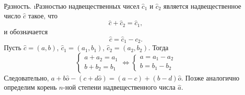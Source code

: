 \b{Разность.} \i{Разностью} надвещественных чисел $\hat{c}_1$ и $\hat{c}_2$ является надвещественное число $\hat{c}$ такое, что
	$$\hat{c}+\hat{c}_2=\hat{c}_1,$$
и обозначается
	$$\hat{c}=\hat{c}_1-\hat{c}_2.$$
Пусть $\hat{c}=(a, b)$, $\hat{c}_1=(a_1, b_1)$, $\hat{c}_2=(a_2, b_2)$. Тогда
	$$ \left\{
			\begin{aligned}
				a+a_2=a_1 \\
				b+b_2=b_1
			\end{aligned}
		\right.
		\Leftrightarrow
		\left\{
			\begin{aligned}
				a=a_1-a_2\\
				b=b_1-b_2
			\end{aligned}
		\right.
	$$
Следовательно, $a+b\hat{o}-(c+d\hat{o})=(a-c)+(b-d)\hat{o}$. Позже аналогично определим корень $n$-ной степени надвещественного числа $\hat{a}$.

